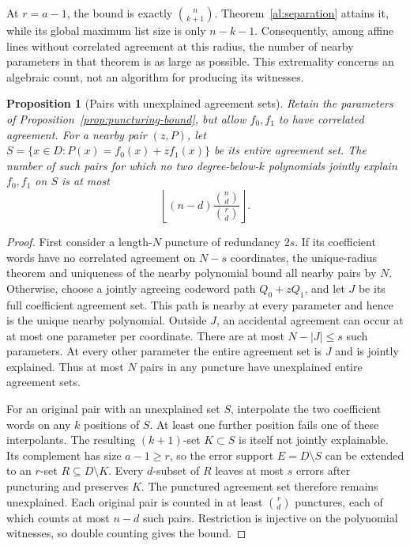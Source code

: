 \documentclass[11pt,letterpaper]{article}
\newtheorem{proposition}[theorem]{Proposition}
\theoremstyle{definition}
\theoremstyle{remark}
\begin{document}
At $r=a-1$, the bound is exactly $\binom n{k+1}$.
Theorem~\ref{al:separation} attains it, while its global maximum
list size is only $n-k-1$. Consequently, among affine lines without
correlated agreement at this radius, the number of nearby parameters
in that theorem is as large as possible. This extremality concerns
an algebraic count, not an algorithm for producing its witnesses.

\begin{proposition}[Pairs with unexplained agreement sets]
\label{prop:puncturing-support}
Retain the parameters of Proposition~\ref{prop:puncturing-bound},
but allow $f_0,f_1$ to have correlated agreement. For a nearby pair
$(z,P)$, let $S=\{x\in D:P(x)=f_0(x)+zf_1(x)\}$ be its entire
agreement set. The number of such pairs for which no two
 degree-below-$k$ polynomials jointly explain $f_0,f_1$ on $S$ is at most
\[
 \left\lfloor(n-d)\frac{\binom nd}{\binom rd}\right\rfloor.
\]
\end{proposition}
\begin{proof}
First consider a length-$N$ puncture of redundancy $2s$. If its
coefficient words have no correlated agreement on $N-s$ coordinates,
the unique-radius theorem and uniqueness of the nearby polynomial
bound all nearby pairs by $N$. Otherwise, choose a jointly agreeing
codeword path $Q_0+zQ_1$, and let $J$ be its full coefficient
agreement set. This path is nearby at every parameter and hence is
the unique nearby polynomial. Outside $J$, an accidental agreement
can occur at at most one parameter per coordinate. There are at most
$N-|J|\le s$ such parameters. At every other parameter the entire
agreement set is $J$ and is jointly explained. Thus at most $N$
pairs in any puncture have unexplained entire agreement sets.

For an original pair with an unexplained set $S$, interpolate the
two coefficient words on any $k$ positions of $S$. At least one
further position fails one of these interpolants. The resulting
$(k+1)$-set $K\subset S$ is itself not jointly explainable. Its
complement has size $a-1\ge r$, so the error support $E=D\setminus S$
can be extended to an $r$-set $R\subseteq D\setminus K$.
Every $d$-subset of $R$ leaves at most $s$ errors after puncturing
and preserves $K$. The punctured agreement set therefore remains
unexplained. Each original pair is counted in at least $\binom rd$
punctures, each of which counts at most $n-d$ such pairs. Restriction
is injective on the polynomial witnesses, so double counting gives
the bound.
\end{proof}
\end{document}
